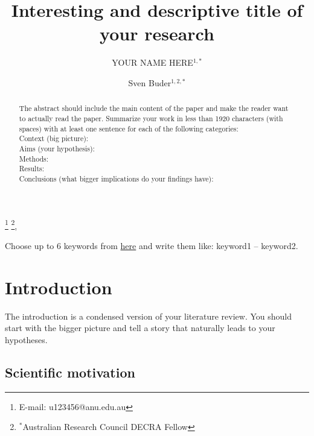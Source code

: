 \documentclass[twocolumn,apj,numberedappendix,appendixfloats]{openjournal}
\begin{document}
\title{Interesting and descriptive title of your research}

\author{\vspace{-1.5cm}YOUR NAME HERE$^{1,*}$}
\author{Sven Buder$^{1,2,*}$}




\thanks{E-mail: u123456@anu.edu.au}
\thanks{$^*$Australian Research Council DECRA Fellow},

\begin{abstract}
The abstract should include the main content of the paper and make the reader want to actually read the paper. Summarize your work in less than 1920 characters (with spaces) with at least one sentence for each of the following categories:\\
Context (big picture): \\ 
Aims (your hypothesis): \\
Methods: \\
Results: \\
Conclusions (what bigger implications do your findings have):
\end{abstract}

\begin{keywords}
    {Choose up to 6 keywords from \href{https://academic.oup.com/DocumentLibrary/mnras/keywords.pdf}{here} and write them like: keyword1 -- keyword2.}
\end{keywords}

\maketitle


\section{Introduction}
\label{sec:introduction}

The introduction is a condensed version of your literature review. You should start with the bigger picture and tell a story that naturally leads to your hypotheses.

\subsection{Scientific motivation}
\end{document}

